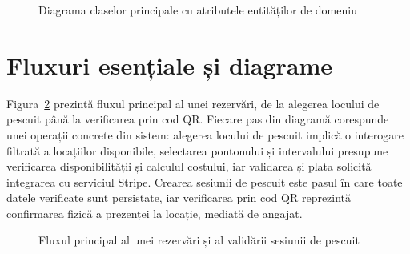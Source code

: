\begin{figure}[htbp]
{%
}
\caption{Diagrama claselor principale cu atributele entităților de domeniu}
\label{fig:diagrama-clase}
\end{figure}

\section{Fluxuri esențiale și diagrame}

Figura~\ref{fig:flux-rezervare-validare} prezintă fluxul principal al unei rezervări, de la alegerea locului de pescuit până la verificarea prin cod QR. Fiecare pas din diagramă corespunde unei operații concrete din sistem: alegerea locului de pescuit implică o interogare filtrată a locațiilor disponibile, selectarea pontonului și intervalului presupune verificarea disponibilității și calculul costului, iar validarea și plata solicită integrarea cu serviciul Stripe. Crearea sesiunii de pescuit este pasul în care toate datele verificate sunt persistate, iar verificarea prin cod QR reprezintă confirmarea fizică a prezenței la locație, mediată de angajat.


\begin{figure}[htbp]
\centering
{}
\caption{Fluxul principal al unei rezervări și al validării sesiunii de pescuit}
\label{fig:flux-rezervare-validare}
\end{figure}

